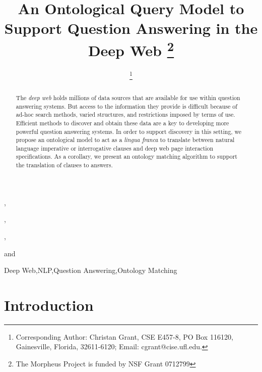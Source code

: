 \documentclass{IOS-Book-Article}
\begin{document}
\begin{frontmatter}

\title{An Ontological Query Model to Support Question Answering in the Deep Web%
\thanks{The Morpheus Project is funded by NSF Grant 0712799}}

\author[A]{ %
\thanks{Corresponding Author: Christan Grant, CSE E457-8, PO Box 116120, Gainesville, Florida, 32611-6120; Email: cgrant@cise.ufl.edu.}},
\author[A]{ },
\author[A]{ },
\author[A]{ }
and
\author[A]{ }

\address[A]{Database Research Center, Computer and Information Science and Engineering Department, University of Florida, Gainesville, FL, USA}

\begin{abstract}
The \emph{deep web} holds millions of data sources that are available for use within question answering systems.  But access to the information they provide is difficult because of ad-hoc search methods, varied structures, and restrictions imposed by terms of use.  Efficient methods to discover and obtain these data are a key to developing more powerful question answering systems.  In order to support discovery in this setting, we propose an ontological model to act as a \textit{lingua franca} to translate between natural language imperative or interrogative clauses and deep web page interaction specifications.  As a corollary, we present an ontology matching algorithm to support the translation of clauses to answers.
\end{abstract}

\begin{keyword}
Deep Web\sep NLP\sep Question Answering\sep Ontology Matching
\end{keyword}

\end{frontmatter}

\thispagestyle{empty}
\pagestyle{empty}


\section*{Introduction}
\end{document}
